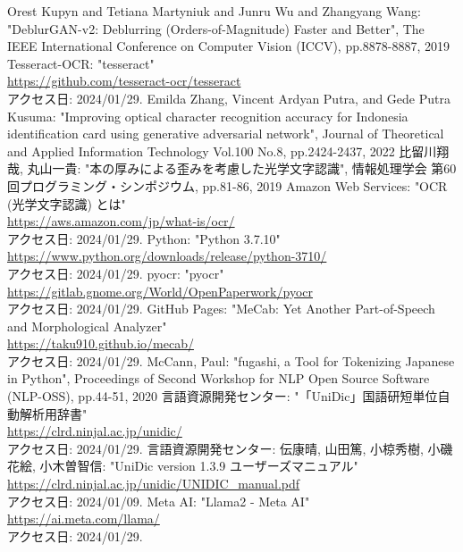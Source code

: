 \documentclass[uplatex, report, a4j, 10pt]{jsbook}
\begin{document}
\begin{thebibliography}{0}
  Orest Kupyn and Tetiana Martyniuk and Junru Wu and Zhangyang Wang: "DeblurGAN-v2: Deblurring (Orders-of-Magnitude) Faster and Better", The IEEE International Conference on Computer Vision (ICCV), pp.8878-8887, 2019
  Tesseract-OCR: "tesseract"\\\url{https://github.com/tesseract-ocr/tesseract}\\アクセス日: 2024/01/29.
  Emilda Zhang,  Vincent Ardyan Putra, and Gede Putra Kusuma: "Improving optical character recognition accuracy for Indonesia identification card using generative adversarial network", Journal of Theoretical and Applied Information Technology Vol.100 No.8, pp.2424-2437, 2022
  比留川翔哉, 丸山一貴: "本の厚みによる歪みを考慮した光学文字認識", 情報処理学会 第60回プログラミング・シンポジウム, pp.81-86, 2019
  Amazon Web Services: "OCR (光学文字認識) とは"\\\url{https://aws.amazon.com/jp/what-is/ocr/}\\アクセス日: 2024/01/29.
  Python: "Python 3.7.10"\\\url{https://www.python.org/downloads/release/python-3710/}\\アクセス日: 2024/01/29.
  pyocr: "pyocr"\\\url{https://gitlab.gnome.org/World/OpenPaperwork/pyocr}\\アクセス日: 2024/01/29.
  GitHub Pages: "MeCab: Yet Another Part-of-Speech and Morphological Analyzer"\\\url{https://taku910.github.io/mecab/}\\アクセス日: 2024/01/29.
  McCann, Paul: "fugashi, a Tool for Tokenizing Japanese in Python", Proceedings of Second Workshop for NLP Open Source Software (NLP-OSS), pp.44-51, 2020
  言語資源開発センター: "「UniDic」国語研短単位自動解析用辞書"\\\url{https://clrd.ninjal.ac.jp/unidic/}\\アクセス日: 2024/01/29.
  言語資源開発センター: 伝康晴, 山田篤, 小椋秀樹, 小磯花絵, 小木曽智信: "UniDic version 1.3.9 ユーザーズマニュアル"\\\url{https://clrd.ninjal.ac.jp/unidic/UNIDIC_manual.pdf}\\アクセス日: 2024/01/09.
  Meta AI: "Llama2 - Meta AI"\\\url{https://ai.meta.com/llama/}\\アクセス日: 2024/01/29.

\end{thebibliography}
\end{document}
